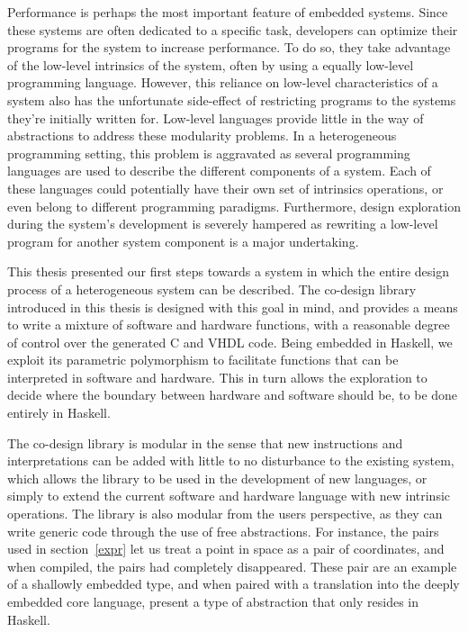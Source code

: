 \documentclass[../paper.tex]{subfiles}
\begin{document}
Performance is perhaps the most important feature of embedded systems. Since these systems are often dedicated to a specific task, developers can optimize their programs for the system to increase performance. To do so, they take advantage of the low-level intrinsics of the system, often by using a equally low-level programming language. However, this reliance on low-level characteristics of a system also has the unfortunate side-effect of restricting programs to the systems they're initially written for. Low-level languages provide little in the way of abstractions to address these modularity problems. In a heterogeneous programming setting, this problem is aggravated as several programming languages are used to describe the different components of a system. Each of these languages could potentially have their own set of intrinsics operations, or even belong to different programming paradigms. Furthermore, design exploration during the system's development is severely hampered as rewriting a low-level program for another system component is a major undertaking.

This thesis presented our first steps towards a system in which the entire design process of a heterogeneous system can be described. The co-design library introduced in this thesis is designed with this goal in mind, and provides a means to write a mixture of software and hardware functions, with a reasonable degree of control over the generated C and VHDL code. Being embedded in Haskell, we exploit its parametric polymorphism to facilitate functions that can be interpreted in software and hardware. This in turn allows the exploration to decide where the boundary between hardware and software should be, to be done entirely in Haskell.

The co-design library is modular in the sense that new instructions and interpretations can be added with little to no disturbance to the existing system, which allows the library to be used in the development of new languages, or simply to extend the current software and hardware language with new intrinsic operations. The library is also modular from the users perspective, as they can write generic code through the use of free abstractions. For instance, the pairs used in section~\ref{expr} let us treat a point in space as a pair of coordinates, and when compiled, the pairs had completely disappeared. These pair are an example of a shallowly embedded type, and when paired with a translation into the deeply embedded core language, present a type of abstraction that only resides in Haskell.
\end{document}
